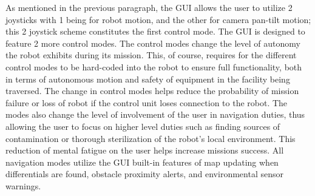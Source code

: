As mentioned in the previous paragraph, the GUI allows the user to utilize 2 joysticks with 1 being for robot motion, and the other for camera pan-tilt motion; this 2 joystick scheme constitutes the first control mode. The GUI is designed to feature 2 more control modes. The control modes change the level of autonomy the robot exhibits during its mission. This, of course, requires for the different control modes to be hard-coded into the robot to ensure full functionality, both in terms of autonomous motion and safety of equipment in the facility being traversed. The change in control modes helps reduce the probability of mission failure or loss of robot if the control unit loses connection to the robot. The modes also change the level of involvement of the user in navigation duties, thus allowing the user to focus on higher level duties such as finding sources of contamination or thorough sterilization of the robot's local environment. This reduction of mental fatigue on the user helps increase missions success. All navigation modes utilize the GUI built-in features of map updating when differentials are found, obstacle proximity alerts, and environmental sensor warnings. 

